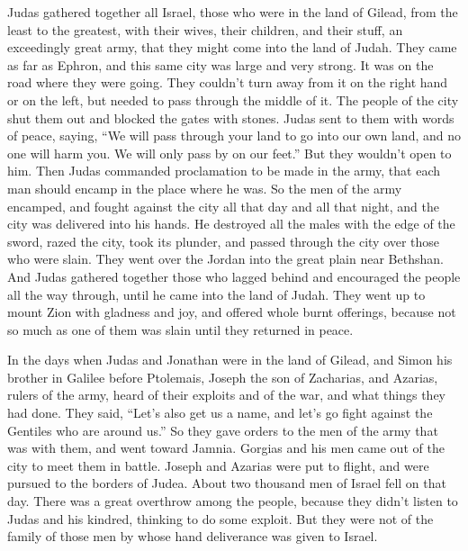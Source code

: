  Judas gathered together all Israel, those who were in
the land of Gilead, from the least to the greatest, with their wives,
their children, and their stuff, an exceedingly great army, that they
might come into the land of Judah.  They came as far as
Ephron, and this same city was large and very strong. It was on the road
where they were going. They couldn't turn away from it on the right hand
or on the left, but needed to pass through the middle of it.
 The people of the city shut them out and blocked the
gates with stones.  Judas sent to them with words of
peace, saying, ``We will pass through your land to go into our own land,
and no one will harm you. We will only pass by on our feet.'' But they
wouldn't open to him.  Then Judas commanded proclamation
to be made in the army, that each man should encamp in the place where
he was.  So the men of the army encamped, and fought
against the city all that day and all that night, and the city was
delivered into his hands.  He destroyed all the males
with the edge of the sword, razed the city, took its plunder, and passed
through the city over those who were slain.  They went
over the Jordan into the great plain near Bethshan.  And
Judas gathered together those who lagged behind and encouraged the
people all the way through, until he came into the land of Judah.
 They went up to mount Zion with gladness and joy, and
offered whole burnt offerings, because not so much as one of them was
slain until they returned in peace.

 In the days when Judas and Jonathan were in the land of
Gilead, and Simon his brother in Galilee before Ptolemais,
 Joseph the son of Zacharias, and Azarias, rulers of the
army, heard of their exploits and of the war, and what things they had
done.  They said, ``Let's also get us a name, and let's
go fight against the Gentiles who are around us.''  So
they gave orders to the men of the army that was with them, and went
toward Jamnia.  Gorgias and his men came out of the city
to meet them in battle.  Joseph and Azarias were put to
flight, and were pursued to the borders of Judea. About two thousand men
of Israel fell on that day.  There was a great overthrow
among the people, because they didn't listen to Judas and his kindred,
thinking to do some exploit.  But they were not of the
family of those men by whose hand deliverance was given to Israel.

